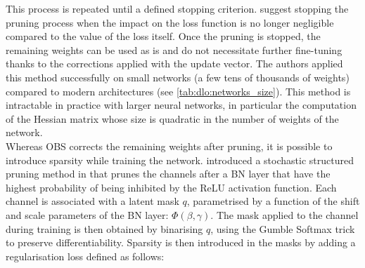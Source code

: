 This process is repeated until a defined stopping criterion.
\citeauthor{DBLP:conf/nips/HassibiS92} suggest stopping the pruning process when
the impact on the loss function is no longer negligible compared to the value of
the loss itself. Once the pruning is stopped, the remaining weights can be used
as is and do not necessitate further fine-tuning thanks to the corrections
applied with the update vector. The authors applied this method successfully on
small networks (a few tens of thousands of weights) compared to modern
architectures (see \cref{tab:dlo:networks_size}). This method is intractable in
practice with larger neural networks, in particular the computation of the
Hessian matrix whose size is quadratic in the number of weights of the
network.\\

Whereas \ac{OBS} corrects the remaining weights after pruning, it is possible to
introduce sparsity while training the network.
\citeauthor{DBLP:conf/icml/KangH20} introduced a stochastic structured pruning
method in \cite{DBLP:conf/icml/KangH20} that prunes the channels after a \ac{BN}
layer that have the highest probability of being inhibited by the \ac{ReLU}
activation function. Each channel is associated with a latent mask $q$,
parametrised by a function of the shift and scale parameters of the \ac{BN}
layer: $\Phi(\beta,\gamma)$. The mask applied to the channel during training is
then obtained by binarising $q$, using the Gumble Softmax trick
\cite{DBLP:conf/iclr/JangGP17} to preserve differentiability. Sparsity is then
introduced in the masks by adding a regularisation loss defined as follows:\\ 






